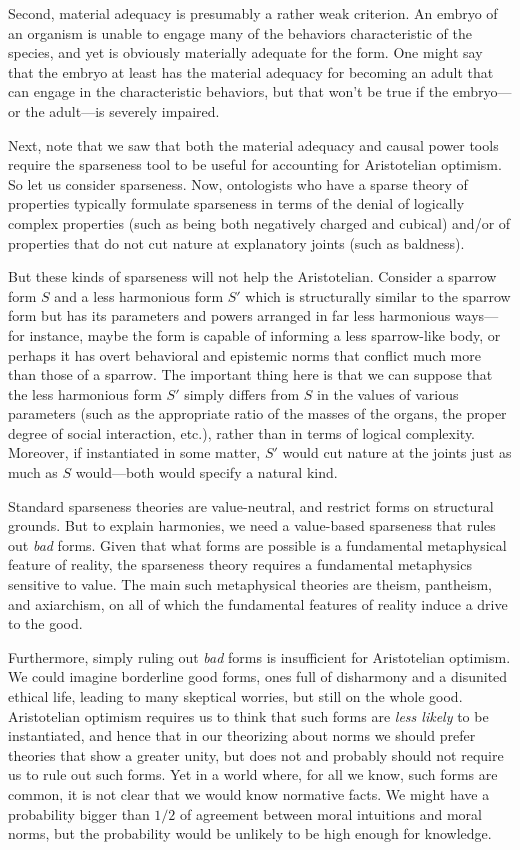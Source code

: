 Second, material adequacy is presumably a rather weak criterion. An embryo of an organism is unable to engage many
of the behaviors characteristic of the species, and yet is obviously materially adequate for the form. One might
say that the embryo at least has the material adequacy for becoming an adult that can engage in the characteristic
behaviors, but that won't be true if the embryo---or the adult---is severely impaired. 

Next, note that we saw that both the material adequacy and causal power tools require the sparseness tool to be useful
for accounting for Aristotelian optimism. So let us consider sparseness. Now, ontologists who have a sparse theory of properties typically formulate
sparseness in terms of the denial of logically complex properties (such as being both negatively charged and cubical)
and/or of properties that do not cut nature at explanatory joints (such as baldness). 

But these kinds of sparseness will not help the Aristotelian. Consider a sparrow form $S$ and a less harmonious form 
$S'$ which is structurally similar to the sparrow form but has its parameters and powers arranged in far less harmonious 
ways---for instance, maybe the form is capable of informing a less sparrow-like body, or perhaps it has overt 
behavioral and epistemic norms that conflict much more than those of a sparrow. The important thing here is that 
we can suppose that the less harmonious form $S'$ simply differs from $S$ in the values of various parameters
(such as the appropriate ratio of the masses of the organs, the proper degree of social interaction, etc.), rather 
than in terms of logical complexity. Moreover, if instantiated in some matter, $S'$ would cut nature at the joints 
just as much as $S$ would---both would specify a natural kind.

Standard sparseness theories are value-neutral, and restrict forms on structural grounds. But to explain harmonies,
we need a value-based sparseness that rules out \textit{bad} forms. Given that what forms are possible is a fundamental
metaphysical feature of reality, the sparseness theory requires a fundamental metaphysics sensitive to value. The main
such metaphysical theories are theism, pantheism, and axiarchism, on all of which the fundamental features of reality 
induce a drive to the good. 

Furthermore, simply ruling out \textit{bad} forms is insufficient for Aristotelian optimism. We could imagine 
borderline good forms, ones full of disharmony and a disunited ethical life, leading to many skeptical worries, but 
still on the whole good. Aristotelian optimism requires us to think that such forms are \textit{less likely} to be
instantiated, and hence that in our theorizing about norms we should prefer theories that show a greater unity, 
but does not and probably should not require us to rule out such forms. Yet in a world where, for all we know, such 
forms are common, it is not clear that we would know normative facts. We might have a probability bigger than $1/2$
of agreement between moral intuitions and moral norms, but the probability would be unlikely to be high enough for
knowledge.
 
